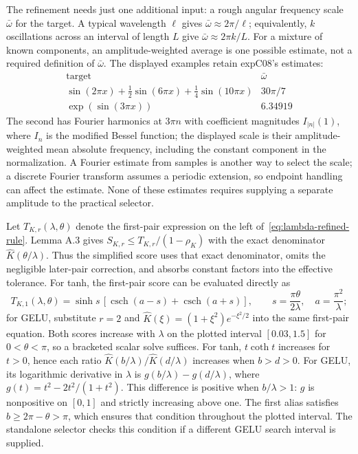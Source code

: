 The refinement needs just one additional input: a rough angular frequency
scale $\bar\omega$ for the target. A typical wavelength $\ell$ gives
$\bar\omega\approx2\pi/\ell$; equivalently, $k$ oscillations across an
interval of length $L$ give $\bar\omega\approx2\pi k/L$.
For a mixture of known components, an amplitude-weighted average is one
possible estimate, not a required definition of $\bar\omega$.
The displayed examples retain expC08's estimates:
\[
\begin{array}{c|c}
\text{target}&\bar\omega\\\hline
\sin(2\pi x)+\tfrac12\sin(6\pi x)+\tfrac14\sin(10\pi x)&30\pi/7\\
\exp(\sin(3\pi x))&6.34919
\end{array}
\]
The second has Fourier harmonics at $3\pi n$ with coefficient magnitudes
$I_{|n|}(1)$, where $I_n$ is the modified Bessel function; the displayed
scale is their amplitude-weighted mean absolute frequency, including the
constant component in the normalization.
A Fourier estimate from samples is another way to select the scale; a
discrete Fourier transform assumes a periodic extension, so endpoint
handling can affect the estimate. None of these estimates requires
supplying a separate amplitude to the practical selector.

Let $T_{K,r}(\lambda,\theta)$ denote the first-pair expression on the
left of~\eqref{eq:lambda-refined-rule}. Lemma A.3 gives
$S_{K,r}\le T_{K,r}/(1-\rho_K)$ with the exact denominator
$\widehat K(\theta/\lambda)$. Thus the simplified score uses that exact
denominator, omits the negligible later-pair correction, and absorbs
constant factors into the effective tolerance. For tanh, the first-pair
score can be evaluated directly as
\[
 T_{K,1}(\lambda,\theta)=\sinh s\,
 [\operatorname{csch}(a-s)+\operatorname{csch}(a+s)],\qquad
 s=\frac{\pi\theta}{2\lambda},\quad a=\frac{\pi^2}{\lambda};
\]
for GELU, substitute $r=2$ and
$\widehat K(\xi)=(1+\xi^2)e^{-\xi^2/2}$ into the same first-pair equation.
Both scores increase with $\lambda$ on the plotted interval $[0.03,1.5]$
for $0<\theta<\pi$, so a bracketed scalar solve suffices.
For tanh, $t\coth t$ increases for $t>0$, hence each ratio
$\widehat K(b/\lambda)/\widehat K(d/\lambda)$ increases when $b>d>0$.
For GELU, its logarithmic derivative in $\lambda$ is
$g(b/\lambda)-g(d/\lambda)$, where
$g(t)=t^2-2t^2/(1+t^2)$. This difference is positive when $b/\lambda>1$:
$g$ is nonpositive on $[0,1]$ and strictly increasing above one.
The first alias satisfies $b\ge2\pi-\theta>\pi$, which ensures that
condition throughout the plotted interval. The standalone selector checks
this condition if a different GELU search interval is supplied.

